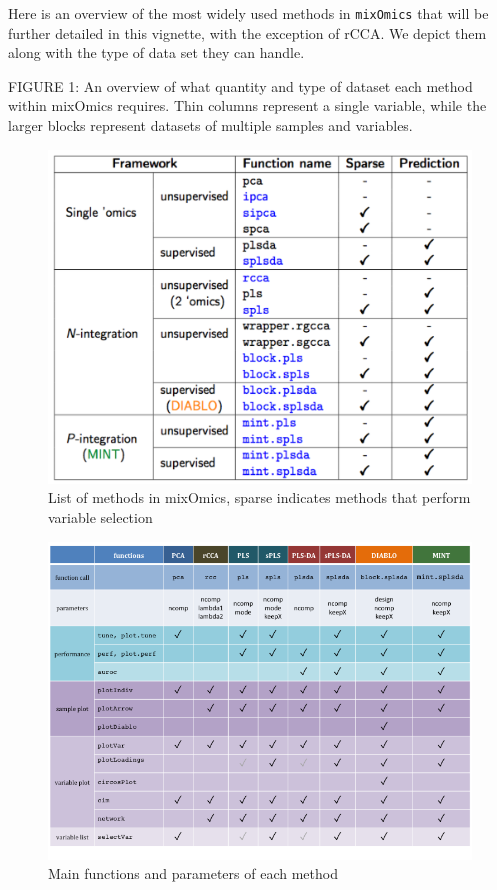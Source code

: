 \documentclass[
]{book}
\begin{document}
Here is an overview of the most widely used methods in \texttt{mixOmics} that will be further detailed in this vignette, with the exception of rCCA. We depict them along with the type of data set they can handle.

FIGURE 1: An overview of what quantity and type of dataset each method within mixOmics requires. Thin columns represent a single variable, while the larger blocks represent datasets of multiple samples and variables.

\begin{figure}[h]

{\centering \includegraphics[width=1\linewidth,]{InputFigures/Methods} 

}

\caption{List of methods in mixOmics, sparse indicates methods that perform variable selection}\label{fig:01-methods-diagram}
\end{figure}

\begin{figure}[h]

{\centering \includegraphics[width=1\linewidth,]{InputFigures/cheatsheet} 

}

\caption{Main functions and parameters of each method}\label{fig:01-cheatsheet}
\end{figure}
\end{document}
